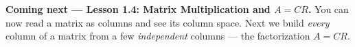 \documentclass[10pt]{article}
\begin{document}
\begin{spiralbox}
\textbf{Coming next --- Lesson 1.4: Matrix Multiplication and $A=CR$.} You can now read a matrix as
columns and see its column space. Next we build \emph{every} column of a matrix from a few
\emph{independent} columns --- the factorization $A=CR$.
\end{spiralbox}
\end{document}
